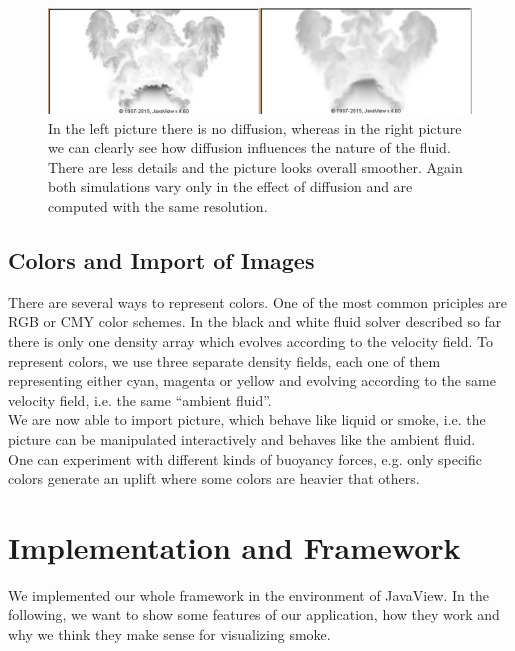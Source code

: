 \documentclass[a4paper,10pt,oneside,final,german,openbib,pdftex,titlepage]{scrbook}
\begin{document}
\begin{figure}[H]
 \centering
 \includegraphics[scale=0.30]{images/Diffusion.png}
 \caption{In the left picture there is no diffusion, whereas in the right picture we can clearly see how diffusion influences the nature of the fluid. There are less details and the picture looks overall smoother. Again both simulations vary only in the effect of diffusion and are computed with the same resolution.}
 \label{ViscosityOnOff}
\end{figure}

\section{Colors and Import of Images}
There are several ways to represent colors. One of the most common priciples are RGB or CMY color schemes. In the black and white fluid solver described so far there is only one density array which evolves according to the velocity field. To represent colors, we use three separate density fields, each one of them representing either cyan, magenta or yellow and evolving according to the same velocity field, i.e. the same ``ambient fluid''.\\

We are now able to import picture, which behave like liquid or smoke, i.e. the picture can be manipulated interactively and behaves like the ambient fluid.\\
One can experiment with different kinds of buoyancy forces, e.g. only specific colors generate an uplift where some colors are heavier that others.

\chapter{Implementation and Framework}
We implemented our whole framework in the environment of JavaView. In the following, we want to show some features of our application, how they work and why we think they make sense for visualizing smoke.
%
\end{document}
